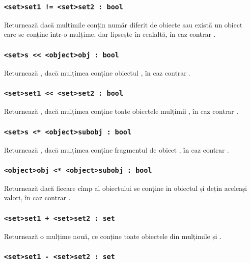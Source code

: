 \subsubsection{\lstinline|<set>set1 != <set>set2 : bool|}

Returnează \true{} dacă mulțimile conțin număr diferit de obiecte sau există un obiect care se conține într-o mulțime, dar lipsește în cealaltă, în caz contrar \false{}.

\subsubsection{\lstinline|<set>s << <object>obj : bool|}

Returnează \true{}, dacă mulțimea  conține obiectul , în caz contrar \false{}.

\subsubsection{\lstinline|<set>set1 << <set>set2 : bool|}

Returnează \true, dacă mulțimea  conține toate obiectele mulțimii , în caz contrar \false.

\subsubsection{\lstinline|<set>s <* <object>subobj : bool|}

Returnează \true{}, dacă mulțimea  conține fragmentul de obiect , în caz contrar \false{}.

\subsubsection{\lstinline|<object>obj <* <object>subobj : bool|}

Returnează \true{} dacă fiecare cîmp al obiectului  se conține in obiectul  și dețin aceleași valori, în caz contrar \false{}.

\subsubsection{\lstinline|<set>set1 + <set>set2 : set|}

Returnează o mulțime nouă, ce conține toate obiectele din mulțimile  și .

\subsubsection{\lstinline|<set>set1 - <set>set2 : set|}


